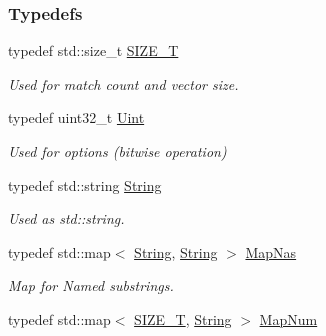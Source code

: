 \subsubsection*{Typedefs}
\begin{DoxyCompactItemize}
\item 
\hypertarget{namespacejpcre2_a2aac465ddcb123560c7c8215dd69246c}{}\label{namespacejpcre2_a2aac465ddcb123560c7c8215dd69246c} 
typedef std\+::size\+\_\+t \hyperlink{namespacejpcre2_a2aac465ddcb123560c7c8215dd69246c}{S\+I\+Z\+E\+\_\+T}
\begin{DoxyCompactList}\small\item\em Used for match count and vector size. \end{DoxyCompactList}\item 
\hypertarget{namespacejpcre2_a078242d38221a13fb3543b9edd78c099}{}\label{namespacejpcre2_a078242d38221a13fb3543b9edd78c099} 
typedef uint32\+\_\+t \hyperlink{namespacejpcre2_a078242d38221a13fb3543b9edd78c099}{Uint}
\begin{DoxyCompactList}\small\item\em Used for options (bitwise operation) \end{DoxyCompactList}\item 
\hypertarget{namespacejpcre2_a91f03070152fb228bc116c5a737f1d16}{}\label{namespacejpcre2_a91f03070152fb228bc116c5a737f1d16} 
typedef std\+::string \hyperlink{namespacejpcre2_a91f03070152fb228bc116c5a737f1d16}{String}
\begin{DoxyCompactList}\small\item\em Used as std\+::string. \end{DoxyCompactList}\item 
\hypertarget{namespacejpcre2_a20bd901c9ca3c949806aa6b9e324f6cf}{}\label{namespacejpcre2_a20bd901c9ca3c949806aa6b9e324f6cf} 
typedef std\+::map$<$ \hyperlink{namespacejpcre2_a91f03070152fb228bc116c5a737f1d16}{String}, \hyperlink{namespacejpcre2_a91f03070152fb228bc116c5a737f1d16}{String} $>$ \hyperlink{namespacejpcre2_a20bd901c9ca3c949806aa6b9e324f6cf}{Map\+Nas}
\begin{DoxyCompactList}\small\item\em Map for Named substrings. \end{DoxyCompactList}\item 
\hypertarget{namespacejpcre2_a947e37f0e4a1678157e7f1f855638e82}{}\label{namespacejpcre2_a947e37f0e4a1678157e7f1f855638e82} 
typedef std\+::map$<$ \hyperlink{namespacejpcre2_a2aac465ddcb123560c7c8215dd69246c}{S\+I\+Z\+E\+\_\+T}, \hyperlink{namespacejpcre2_a91f03070152fb228bc116c5a737f1d16}{String} $>$ \hyperlink{namespacejpcre2_a947e37f0e4a1678157e7f1f855638e82}{Map\+Num}

\end{DoxyCompactItemize}
